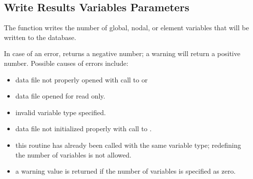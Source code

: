 \subsection{Write Results Variables Parameters}

The function  writes the number of global,
nodal, or element variables that will be written to the database.

In case of an error,  returns a negative
number; a warning will return a positive number. Possible causes of
errors include:

\begin{itemize}
 \item data file not properly opened with call to 
 or 

 \item data file opened for read only.

 \item invalid variable type specified.

 \item data file not initialized properly with call to .

 \item this routine has already been called with the same variable
 type; redefining the number of variables is not allowed.

 \item a warning value is returned if the number of variables 
is specified as zero.
\end{itemize}


